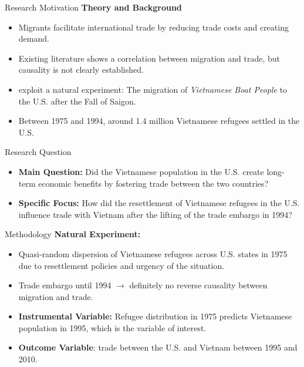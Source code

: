 \documentclass{beamer}
\begin{document}
\begin{frame}{Research Motivation}
\textbf{Theory and Background}
    \begin{itemize}
        \item Migrants facilitate international trade by reducing trade costs and creating demand.
        \item Existing literature shows a correlation between migration and trade, but causality is not clearly established.
        \item \textcite{ParsonsChristopher2018MNAT} exploit a natural experiment: The migration of \textit{Vietnamese Boat People} to the U.S. after the Fall of Saigon.
        \item Between 1975 and 1994, around 1.4 million Vietnamese refugees settled in the U.S.
    \end{itemize}
\end{frame}

\begin{frame}{Research Question}
    \begin{itemize}
        \item \textbf{Main Question:} Did the Vietnamese population in the U.S. create long-term economic benefits by fostering trade between the two countries?
        \item \textbf{Specific Focus:} How did the resettlement of Vietnamese refugees in the U.S. influence trade with Vietnam after the lifting of the trade embargo in 1994?
    \end{itemize}
\end{frame}

\begin{frame}{Methodology}
\textbf{Natural Experiment:}
        \begin{itemize}
            \item Quasi-random dispersion of Vietnamese refugees across U.S. states in 1975 due to resettlement policies and urgency of the situation. %
            \item Trade embargo until 1994 $\rightarrow$ definitely no reverse causality between migration and trade.
        \item \textbf{Instrumental Variable:} Refugee distribution in 1975 predicts Vietnamese population in 1995, which is the variable of interest.%
        \item \textbf{Outcome Variable}: trade between the U.S. and Vietnam between 1995 and 2010.
    \end{itemize}
\end{frame}
\end{document}
